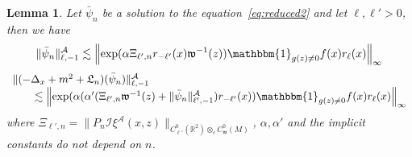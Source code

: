 \documentclass[a4paper,10pt]{article}
\newcommand{\nobracket}{}
\newtheorem{lemma}[theorem]{Lemma}
\begin{document}
\begin{lemma}
  \label{lemma_reduced1}Let $\bar{\psi}_n$ be a solution to the
  equation~{\eqref{eq:reduced2}} and let $\ell, \ell' > 0$, then we have
  \begin{equation}
    \| \bar{\psi}_n \|^{\mathcal{A}}_{\ell, - 1} \lesssim \left\| \exp (\alpha
    \Xi_{\ell', n} r_{- \ell'} (x) \mathfrak{w}^{- 1} (z)) \mathbbm{1}_{g (z)
    \not{=} 0} f (x) r_{\ell} (x) \right\|_{\infty} \label{eq:inequality1}
  \end{equation}
  \begin{equation}
    \begin{array}{l}
      \| (- \Delta_x + m^2 + \mathfrak{L}_n) (\bar{\psi}_n)
      \|^{\mathcal{A}}_{\ell, - 1}\\
      \qquad \lesssim \left\| \exp (\alpha (\alpha' (\Xi_{\ell', n}
      \mathfrak{w}^{- 1} (z) + \| \bar{\psi}_n \|^{\mathcal{A}}_{\ell', - 1})
      r_{- \ell'} (x \nobracket)) \mathbbm{1}_{g (z) \not{=} 0} f (x) r_{\ell}
      (x) \right\|_{\infty}
    \end{array} \label{eq:inequality2}
  \end{equation}
  where $\Xi_{\ell', n} = \| P_n \mathcal{I} \xi^{\mathcal{A}} (x, z)
  \|_{\nobracket C^0_{\ell'} (\mathbb{R}^2 \nobracket) \otimes_{\epsilon}
  C^0_{\mathfrak{w}} (M)}$, $\alpha, \alpha'$ and the implicit constants do
  not depend on $n$.
\end{lemma}
\end{document}
